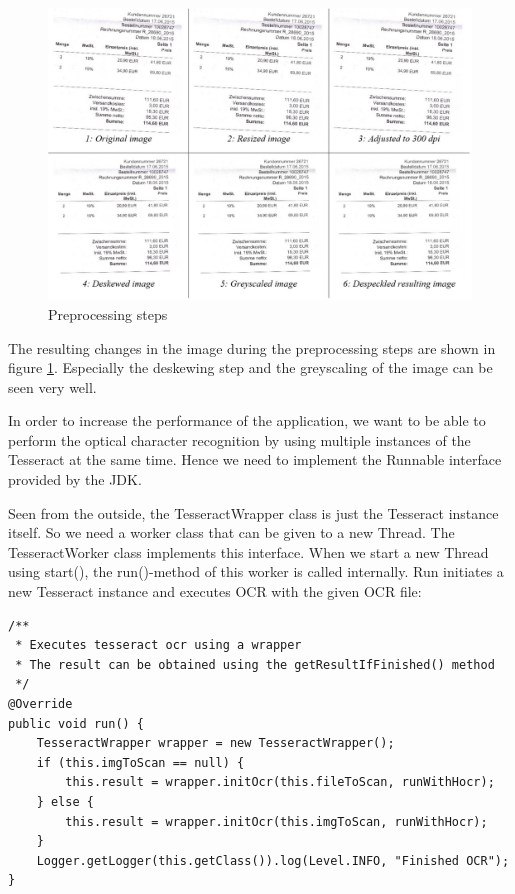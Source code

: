 \begin{figure}[htb!]
\centering
\includegraphics[width=\textwidth,natwidth=472,natheight=325]{Images/OCR/PreprocessingSteps.pdf}
\caption{Preprocessing steps \label{preprocessingSteps}}
\end{figure}

The resulting changes in the image during the preprocessing steps are shown in figure \ref{preprocessingSteps}.
Especially the deskewing step and the greyscaling of the image can be seen very well.

In order to increase the performance of the application, we want to be able to perform the optical character recognition by using multiple instances of the Tesseract at the same time. Hence we need to implement the Runnable interface provided by the JDK. 

Seen from the outside, the TesseractWrapper class is just the Tesseract instance itself. So we need a worker class that can be given to a new Thread. The TesseractWorker class implements this interface. When we start a new Thread using start(), the run()-method of this worker is called internally. Run initiates a new Tesseract instance and executes OCR with the given OCR file: 

\begin{lstlisting}[caption={Initiation of the OCR wrapper}]
/**
 * Executes tesseract ocr using a wrapper
 * The result can be obtained using the getResultIfFinished() method
 */
@Override
public void run() {
    TesseractWrapper wrapper = new TesseractWrapper();
    if (this.imgToScan == null) {
        this.result = wrapper.initOcr(this.fileToScan, runWithHocr);
    } else {
        this.result = wrapper.initOcr(this.imgToScan, runWithHocr);
    }
    Logger.getLogger(this.getClass()).log(Level.INFO, "Finished OCR");
}
\end{lstlisting}

